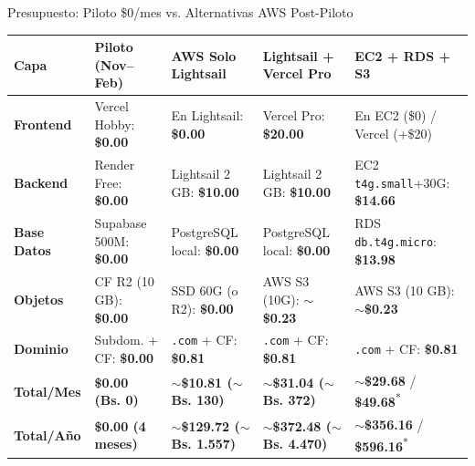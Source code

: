 \documentclass[aspectratio=169,10pt]{beamer}
\begin{document}
\begin{frame}[t]{Presupuesto: Piloto \$0/mes vs. Alternativas AWS Post-Piloto}
    \vspace{-0.20cm}
    \begin{center}
    {\setlength{\tabcolsep}{1.8pt}
    \renewcommand{\arraystretch}{0.98}
    \fontsize{6.0}{7.3}\selectfont
    \begin{tabular}{@{} l l l l l @{}}
        \toprule
        \textbf{Capa} & \textbf{Piloto (Nov--Feb)} & \textbf{AWS Solo Lightsail} & \textbf{Lightsail + Vercel Pro} & \textbf{EC2 + RDS + S3} \\
        \midrule
        \textbf{Frontend} & Vercel Hobby: \textbf{\$0.00} & En Lightsail: \textbf{\$0.00} & Vercel Pro: \textbf{\$20.00} & En EC2 (\$0) / Vercel (+\$20) \\
        \textbf{Backend} & Render Free: \textbf{\$0.00} & Lightsail 2 GB: \textbf{\$10.00} & Lightsail 2 GB: \textbf{\$10.00} & EC2 \texttt{t4g.small}+30G: \textbf{\$14.66} \\
        \textbf{Base Datos} & Supabase 500M: \textbf{\$0.00} & PostgreSQL local: \textbf{\$0.00} & PostgreSQL local: \textbf{\$0.00} & RDS \texttt{db.t4g.micro}: \textbf{\$13.98} \\
        \textbf{Objetos} & CF R2 (10 GB): \textbf{\$0.00} & SSD 60G (o R2): \textbf{\$0.00} & AWS S3 (10G): \textbf{$\sim$\$0.23} & AWS S3 (10 GB): \textbf{$\sim$\$0.23} \\
        \textbf{Dominio} & Subdom. + CF: \textbf{\$0.00} & \texttt{.com} + CF: \textbf{\$0.81} & \texttt{.com} + CF: \textbf{\$0.81} & \texttt{.com} + CF: \textbf{\$0.81} \\
        \midrule
        \textbf{Total/Mes} & \textbf{\$0.00 (Bs. 0)} & \textbf{$\sim$\$10.81 ($\sim$Bs. 130)} & \textbf{$\sim$\$31.04 ($\sim$Bs. 372)} & \textbf{$\sim$\$29.68} / \textbf{\$49.68}\textsuperscript{*} \\
        \textbf{Total/A\~no} & \textbf{\$0.00 (4 meses)} & \textbf{$\sim$\$129.72 ($\sim$Bs. 1.557)} & \textbf{$\sim$\$372.48 ($\sim$Bs. 4.470)} & \textbf{$\sim$\$356.16} / \textbf{\$596.16}\textsuperscript{*} \\
        \bottomrule
    \end{tabular}}
    \end{center}


\end{frame}
\end{document}

